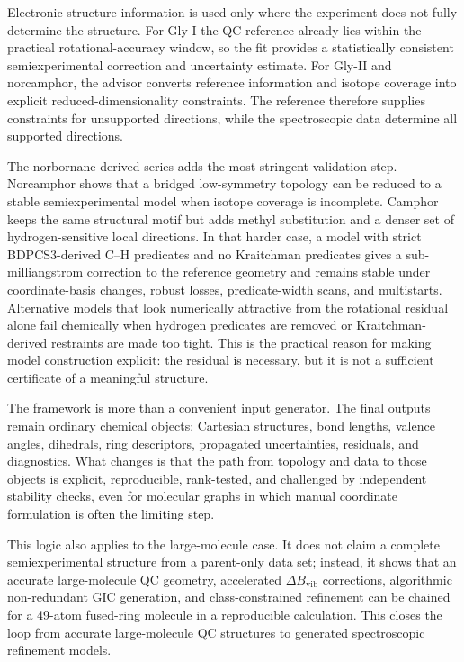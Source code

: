 \documentclass[aip,jcp,reprint,longbibliography,floatfix]{revtex4-2}
\begin{document}
Electronic-structure information is used only where the experiment does not
fully determine the structure. For Gly-I the QC reference already lies within
the practical rotational-accuracy window, so the fit provides a statistically
consistent semiexperimental correction and uncertainty estimate. For Gly-II
and norcamphor, the advisor converts reference information and isotope
coverage into explicit reduced-dimensionality constraints. The reference
therefore supplies constraints for unsupported directions, while the
spectroscopic data determine all supported directions.

The norbornane-derived series adds the most stringent validation step. Norcamphor
shows that a bridged low-symmetry topology can be reduced to a stable
semiexperimental model when isotope coverage is incomplete. Camphor keeps the
same structural motif but adds methyl substitution and a denser set of
hydrogen-sensitive local directions. In that harder case, a model with strict
BDPCS3-derived C--H predicates and no Kraitchman predicates gives a
sub-milliangstrom correction to the reference geometry and remains stable
under coordinate-basis changes, robust losses, predicate-width scans, and
multistarts. Alternative models that look numerically attractive from the
rotational residual alone fail chemically when hydrogen predicates are removed
or Kraitchman-derived restraints are made too tight. This is the practical
reason for making model construction explicit: the residual is necessary, but
it is not a sufficient certificate of a meaningful structure.

The framework is more than a convenient input generator. The final outputs remain
ordinary chemical objects: Cartesian structures, bond lengths, valence angles,
dihedrals, ring descriptors, propagated uncertainties, residuals, and
diagnostics. What changes is that the path from topology and data to those
objects is explicit, reproducible, rank-tested, and challenged by independent
stability checks, even for molecular graphs in which manual coordinate
formulation is often the limiting step.

This logic also applies to the large-molecule case. It does not claim a complete
semiexperimental structure from a parent-only data set; instead, it shows that
an accurate large-molecule QC geometry, accelerated $\Delta B_\mathrm{vib}$
corrections, algorithmic non-redundant GIC generation, and class-constrained
refinement can be chained for a 49-atom fused-ring molecule in a
reproducible calculation. This closes the loop from accurate
large-molecule QC structures to generated spectroscopic
refinement models.
\end{document}
